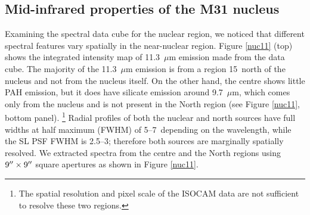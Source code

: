 \subsection{Mid-infrared properties of the M31 nucleus}
\label{sect:nucleus}


Examining the spectral data cube for the nuclear region, we noticed that different spectral features
vary spatially in the near-nuclear region.
Figure \ref{nuc11} (top) shows the integrated intensity map of 11.3~$\mu$m emission made from the data cube. 
The majority of the 11.3~$\mu$m  emission is from a region 15\arcsec\ north of the nucleus and not from the nucleus itself. 
On the other hand, the centre shows little PAH emission,  but it does have silicate emission around 9.7~$\mu$m, 
which comes only from the nucleus and is not present in the North region  (see Figure \ref{nuc11}, bottom panel).%
\footnote{The spatial resolution and pixel scale of the ISOCAM data are not sufficient to resolve these two regions.}
Radial profiles of both the nuclear and north sources have full widths at half maximum (FWHM) of 5--7\arcsec\ 
depending on the wavelength, while the SL PSF FWHM is 2.5--3\arcsec; therefore both sources are
marginally spatially resolved.  
We extracted spectra from the centre and the North regions using  $9\hbox{$^{\prime\prime}$} \times 9\hbox{$^{\prime\prime}$}$ 
square apertures as shown in Figure \ref{nuc11}. 

